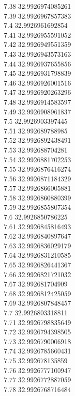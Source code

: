 {7.38	32.9926974085261\\
7.39	32.9926967857383\\
7.4	32.9926961692854\\
7.41	32.9926955591052\\
7.42	32.9926949551359\\
7.43	32.9926943573163\\
7.44	32.9926937655856\\
7.45	32.9926931798839\\
7.46	32.9926926001516\\
7.47	32.9926920263296\\
7.48	32.9926914583597\\
7.49	32.9926908961837\\
7.5	32.9926903397445\\
7.51	32.992689788985\\
7.52	32.9926892438491\\
7.53	32.992688704281\\
7.54	32.9926881702253\\
7.55	32.9926876416274\\
7.56	32.9926871184329\\
7.57	32.9926866005881\\
7.58	32.9926860880399\\
7.59	32.9926855807354\\
7.6	32.9926850786225\\
7.61	32.9926845816493\\
7.62	32.9926840897647\\
7.63	32.9926836029179\\
7.64	32.9926831210585\\
7.65	32.9926826441367\\
7.66	32.9926821721032\\
7.67	32.992681704909\\
7.68	32.9926812425059\\
7.69	32.9926807848457\\
7.7	32.9926803318811\\
7.71	32.9926798835649\\
7.72	32.9926794398505\\
7.73	32.9926790006918\\
7.74	32.9926785660431\\
7.75	32.992678135859\\
7.76	32.9926777100947\\
7.77	32.9926772887059\\
7.78	32.9926768716484\\
}
